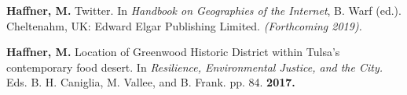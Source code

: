 

\begin{cventries}
   \cventry
      {}
      {}
      {}
      {}
      {
        \begin{cvitems}
          \vspace{-4mm}
        \item {\textbf{Haffner, M.} Twitter. In \textit{Handbook on Geographies
              of the Internet}, B. Warf (ed.). Cheltenahm, UK: Edward Elgar
            Publishing Limited. \textit{(Forthcoming 2019).}}
        \end{cvitems} 
    }

\end{cventries}



\begin{cventries}
   \cventry
      {}
      {}
      {}
      {}
      {
        \begin{cvitems}
          \vspace{-4mm}
        \item {\textbf{Haffner, M.} Location of Greenwood Historic District
            within Tulsa's contemporary food desert. In \textit{Resilience,
              Environmental Justice, and the City.} Eds. B. H. Caniglia, M.
            Vallee, and B.
            Frank. pp. 84. \textbf{2017.}} \\
          \vspace{-2mm}
        \end{cvitems}
    }

\end{cventries}